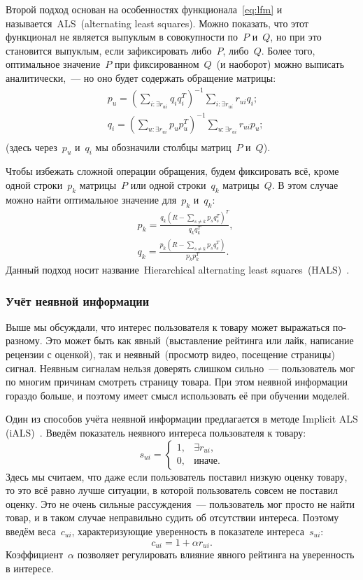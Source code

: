 \documentclass[12pt,fleqn]{article}
\begin{document}
Второй подход основан на особенностях функционала~\eqref{eq:lfm} и называется~ALS~(alternating least squares).
Можно показать, что этот функционал не является выпуклым в совокупности по~$P$ и~$Q$,
но при это становится выпуклым, если зафиксировать либо~$P$, либо~$Q$.
Более того, оптимальное значение~$P$ при фиксированном~$Q$~(и наоборот) можно выписать аналитически,~---
но оно будет содержать обращение матрицы:
\begin{align*}
    &p_u
    =
    \left(
        \sum_{i: \exists r_{ui}}
            q_i q_i^T
    \right)^{-1}
    \sum_{i: \exists r_{ui}}
        r_{ui} q_i;\\
    &q_i
    =
    \left(
        \sum_{u: \exists r_{ui}}
            p_u p_u^T
    \right)^{-1}
    \sum_{u: \exists r_{ui}}
        r_{ui} p_u;\\
\end{align*}
(здесь через~$p_u$ и~$q_i$ мы обозначили столбцы матриц~$P$ и~$Q$).

Чтобы избежать сложной операции обращения, будем фиксировать всё, кроме одной строки~$p_k$ матрицы~$P$
или одной строки~$q_k$ матрицы~$Q$.
В этом случае можно найти оптимальное значение для~$p_k$ и~$q_k$:
\begin{align*}
    &p_k
    =
    \frac{q_k (R - \sum_{s \neq k} p_s q_s^T)^T}{q_k q_k^T},\\
    &q_k
    =
    \frac{p_k (R - \sum_{s \neq k} p_s q_s^T)}{p_k p_k^T}.
\end{align*}
Данный подход носит название~Hierarchical alternating least squares~(HALS)~\cite{gillis12hals}.

\subsubsection{Учёт неявной информации}
Выше мы обсуждали, что интерес пользователя к товару может выражаться по-разному.
Это может быть как явный~(выставление рейтинга или лайк, написание рецензии с оценкой),
так и неявный~(просмотр видео, посещение страницы) сигнал.
Неявным сигналам нельзя доверять слишком сильно~--- пользователь мог по многим причинам смотреть
страницу товара.
При этом неявной информации гораздо больше, и поэтому имеет смысл использовать её при обучении моделей.

Один из способов учёта неявной информации предлагается в методе Implicit ALS (iALS)~\cite{hu08ials}.
Введём показатель неявного интереса пользователя к товару:
\[
    s_{ui}
    =
    \begin{cases}
        1, & \exists r_{ui},\\
        0, & \text{иначе}.
    \end{cases}
\]
Здесь мы считаем, что даже если пользователь поставил низкую оценку товару,
то это всё равно лучше ситуации, в которой пользователь совсем не поставил оценку.
Это не очень сильные рассуждения~--- пользователь мог просто не найти
товар, и в таком случае неправильно судить об отсутствии интереса.
Поэтому введём веса~$c_{ui}$, характеризующие уверенность в показателе интереса~$s_{ui}$:
\[
    c_{ui}
    =
    1 + \alpha r_{ui}.
\]
Коэффициент~$\alpha$ позволяет регулировать влияние явного рейтинга на уверенность в интересе.
\end{document}
